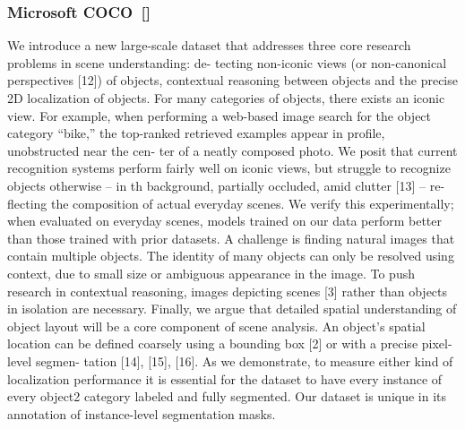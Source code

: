 \subsubsection{Microsoft COCO~[\cite{lin_microsoft_2014}]}
We introduce a new large-scale dataset that addresses
three core research problems in scene understanding: de-
tecting non-iconic views (or non-canonical perspectives
[12]) of objects, contextual reasoning between objects
and the precise 2D localization of objects. For many
categories of objects, there exists an iconic view. For
example, when performing a web-based image search
for the object category “bike,” the top-ranked retrieved
examples appear in profile, unobstructed near the cen-
ter of a neatly composed photo. We posit that current
recognition systems perform fairly well on iconic views,
but struggle to recognize objects otherwise – in th
background, partially occluded, amid clutter [13] – re-
flecting the composition of actual everyday scenes. We
verify this experimentally; when evaluated on everyday
scenes, models trained on our data perform better than
those trained with prior datasets. A challenge is finding
natural images that contain multiple objects. The identity
of many objects can only be resolved using context, due
to small size or ambiguous appearance in the image. To
push research in contextual reasoning, images depicting
scenes [3] rather than objects in isolation are necessary.
Finally, we argue that detailed spatial understanding of
object layout will be a core component of scene analysis.
An object’s spatial location can be defined coarsely using
a bounding box [2] or with a precise pixel-level segmen-
tation [14], [15], [16]. As we demonstrate, to measure
either kind of localization performance it is essential
for the dataset to have every instance of every object2
category labeled and fully segmented. Our dataset is
unique in its annotation of instance-level segmentation
masks.
